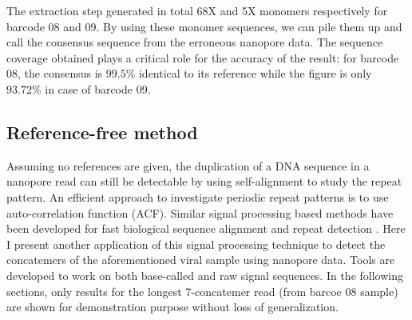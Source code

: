 The extraction step generated in total 68X and 5X monomers respectively for barcode 08 and 09. By using these monomer sequences, we can pile them up and call the consensus sequence from the erroneous nanopore data. The sequence coverage obtained plays a critical role for the accuracy of the result: for barcode 08, the consensus is $99.5\%$ identical to its reference while the figure is only $93.72\%$ in case of barcode 09. 

\subsection{Reference-free method}
Assuming no references are given, the duplication of a DNA sequence in a nanopore read can still be detectable by using self-alignment to study the repeat pattern.
An efficient approach to investigate periodic repeat patterns is to use auto-correlation function (ACF).
Similar signal processing based methods have been developed for fast biological sequence alignment and repeat detection \cite{Rockwood2005crosscorrelation,Ravi2007tandem}.
Here I present another application of this signal processing technique to detect the concatemers of the aforementioned viral sample using nanopore data. 
Tools are developed to work on both base-called and raw signal sequences.
In the following sections, only results for the longest 7-concatemer read (from barcoe 08 sample) are shown for demonstration purpose without loss of generalization.
